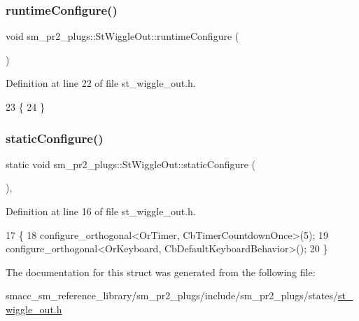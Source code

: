 \subsubsection{\texorpdfstring{runtime\+Configure()}{runtimeConfigure()}}
{\footnotesize\ttfamily void sm\+\_\+pr2\+\_\+plugs\+::\+St\+Wiggle\+Out\+::runtime\+Configure (\begin{DoxyParamCaption}{ }\end{DoxyParamCaption})\hspace{0.3cm}{\ttfamily [inline]}}



Definition at line 22 of file st\+\_\+wiggle\+\_\+out.\+h.


\begin{DoxyCode}
23     \{
24     \}
\end{DoxyCode}
\mbox{\label{structsm__pr2__plugs_1_1StWiggleOut_ad4db8d9b75e1fd0fb6641666d0b10554}} 
\subsubsection{\texorpdfstring{static\+Configure()}{staticConfigure()}}
{\footnotesize\ttfamily static void sm\+\_\+pr2\+\_\+plugs\+::\+St\+Wiggle\+Out\+::static\+Configure (\begin{DoxyParamCaption}{ }\end{DoxyParamCaption})\hspace{0.3cm}{\ttfamily [inline]}, {\ttfamily [static]}}



Definition at line 16 of file st\+\_\+wiggle\+\_\+out.\+h.


\begin{DoxyCode}
17     \{
18         configure\_orthogonal<OrTimer,  CbTimerCountdownOnce>(5);    
19         configure\_orthogonal<OrKeyboard, CbDefaultKeyboardBehavior>();
20     \}
\end{DoxyCode}


The documentation for this struct was generated from the following file\+:\begin{DoxyCompactItemize}
\item 
smacc\+\_\+sm\+\_\+reference\+\_\+library/sm\+\_\+pr2\+\_\+plugs/include/sm\+\_\+pr2\+\_\+plugs/states/\hyperlink{st__wiggle__out_8h}{st\+\_\+wiggle\+\_\+out.\+h}\end{DoxyCompactItemize}
